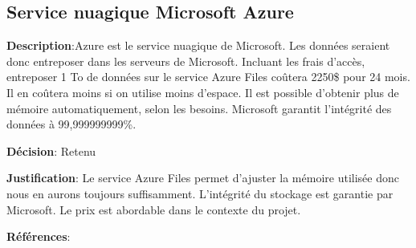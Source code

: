 

\subsection{Service nuagique Microsoft Azure}
\label{s:archiver_conc3}

\textbf{Description}:Azure est le service nuagique de Microsoft. Les données seraient donc entreposer dans les serveurs de Microsoft. Incluant les frais d’accès, entreposer 1 To de données sur le service Azure Files coûtera 2250\$ pour 24 mois. Il en coûtera moins si on utilise moins d’espace. Il est possible d’obtenir plus de mémoire automatiquement, selon les besoins. Microsoft garantit l’intégrité des données à 99,999999999\%.

\textbf{Décision}: Retenu 

\textbf{Justification}: Le service Azure Files permet d’ajuster la mémoire utilisée donc nous en aurons toujours suffisamment. L’intégrité du stockage est garantie par Microsoft. Le prix est abordable dans le contexte du projet.

\textbf{Références}: 
\cite{msAzFile, msRedunLRS}
